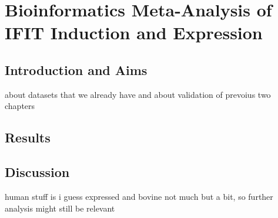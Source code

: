 \chapter{Bioinformatics Meta-Analysis of IFIT Induction and Expression} \label{ch:Bioinformatics Meta-Analysis of IFIT Induction and Expression}

\section{Introduction and Aims} \label{sec:Introduction and Aims-Chapter3}
about datasets that we already have and about validation of prevoius two chapters



\section{Results} \label{sec:Results-Chapter3}





\section{Discussion} \label{sec:Discussion-Chapter3}
human stuff is i guess expressed and bovine not much but a bit, so further analysis might still be relevant